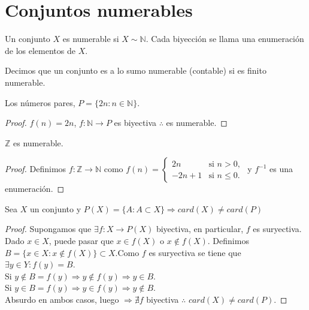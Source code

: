 \section{Conjuntos numerables}

\begin{definition}
    Un conjunto $X$ es numerable si $X \sim \mathbb{N}$. Cada biyección se llama una enumeración de los elementos de $X$. 
\end{definition}

\begin{definition}
    Decimos que un conjunto es a lo sumo numerable (contable) si es finito numerable.
\end{definition}

\begin{eg}
    Los números pares, $P = \{ 2n:n \in \mathbb{N} \}$.
    \begin{proof}
        $f(n) = 2n$, $f: \mathbb{N} \to P$ es biyectiva $\therefore$ es numerable.
    \end{proof}
\end{eg}

\begin{eg}
    $\mathbb{Z}$ es numerable. 
    \begin{proof}
        Definimos $f: \mathbb{Z} \to \mathbb{N}$ como $f(n) = \begin{cases}
            2n & \text{si } n >0, \\
            -2n+1 & \text{si } n \leq 0.
        \end{cases}$ y $f^{-1}$ es una enumeración.
    \end{proof}
\end{eg}

\begin{theorem}
    Sea $X$ un conjunto y $P(X) = \{ A : A \subset X \} \Rightarrow card(X) \neq card(P)$
    \begin{proof}
        Supongamos que $\exists f:X \to P(X)$ biyectiva, en particular, $f$ es suryectiva. \\
        Dado $x \in X$, puede pasar que $x \in f(X)$ o $x \notin f(X)$. Definimos $B = \{ x \in X: x \notin f(X) \} \subset X$.Como $f$ es suryectiva se tiene que $\exists y \in Y: f(y) = B$. \\
        Si $y \notin B=f(y) \Rightarrow y \notin f(y) \Rightarrow y \in B$. \\
        Si $y \in B = f(y) \Rightarrow y \in f(y) \Rightarrow y \notin B$. \\
        Absurdo en ambos casos, luego $\Rightarrow \nexists f$ biyectiva $\therefore$ $card(X) \neq card(P)$.
    \end{proof}
\end{theorem}

